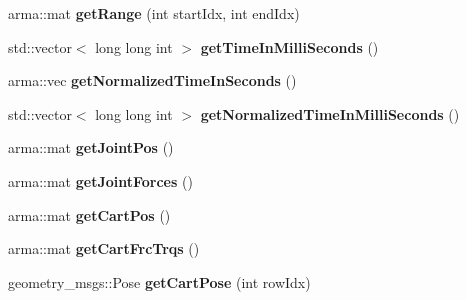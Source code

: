\begin{DoxyCompactItemize}
\item 
arma\+::mat {\bfseries get\+Range} (int start\+Idx, int end\+Idx)\hypertarget{classkukadu_1_1SensorData_afd4508a9b24265d7a695f7131c443b1c}{}\label{classkukadu_1_1SensorData_afd4508a9b24265d7a695f7131c443b1c}

\item 
std\+::vector$<$ long long int $>$ {\bfseries get\+Time\+In\+Milli\+Seconds} ()\hypertarget{classkukadu_1_1SensorData_a731561cb5af4d93cefa918d949bb5b71}{}\label{classkukadu_1_1SensorData_a731561cb5af4d93cefa918d949bb5b71}

\item 
arma\+::vec {\bfseries get\+Normalized\+Time\+In\+Seconds} ()\hypertarget{classkukadu_1_1SensorData_a38a677049a6f7795aaef6d80eb60acf0}{}\label{classkukadu_1_1SensorData_a38a677049a6f7795aaef6d80eb60acf0}

\item 
std\+::vector$<$ long long int $>$ {\bfseries get\+Normalized\+Time\+In\+Milli\+Seconds} ()\hypertarget{classkukadu_1_1SensorData_adc7f06ab4093c175af005401971551df}{}\label{classkukadu_1_1SensorData_adc7f06ab4093c175af005401971551df}

\item 
arma\+::mat {\bfseries get\+Joint\+Pos} ()\hypertarget{classkukadu_1_1SensorData_a67da976e625fc3cf63a2533dd928dc26}{}\label{classkukadu_1_1SensorData_a67da976e625fc3cf63a2533dd928dc26}

\item 
arma\+::mat {\bfseries get\+Joint\+Forces} ()\hypertarget{classkukadu_1_1SensorData_a4d00473768440cec0fae061a39edf1c8}{}\label{classkukadu_1_1SensorData_a4d00473768440cec0fae061a39edf1c8}

\item 
arma\+::mat {\bfseries get\+Cart\+Pos} ()\hypertarget{classkukadu_1_1SensorData_ac15ea28f157a22b8144e2099127e4a15}{}\label{classkukadu_1_1SensorData_ac15ea28f157a22b8144e2099127e4a15}

\item 
arma\+::mat {\bfseries get\+Cart\+Frc\+Trqs} ()\hypertarget{classkukadu_1_1SensorData_a512395b5d0a4a72ff80625d81e97c54f}{}\label{classkukadu_1_1SensorData_a512395b5d0a4a72ff80625d81e97c54f}

\item 
geometry\+\_\+msgs\+::\+Pose {\bfseries get\+Cart\+Pose} (int row\+Idx)\hypertarget{classkukadu_1_1SensorData_a3449c73935a580ace1b611c3514df9cf}{}\label{classkukadu_1_1SensorData_a3449c73935a580ace1b611c3514df9cf}


\end{DoxyCompactItemize}
